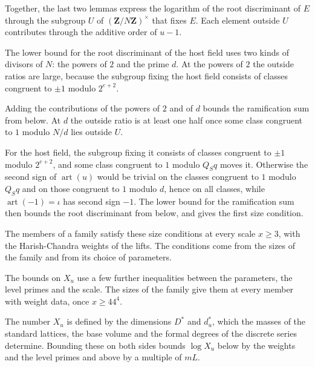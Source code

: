 Together, the last two lemmas express the logarithm of the root discriminant of
$E$ through the subgroup $U$ of $(\mathbf Z/N\mathbf Z)^\times$ that fixes $E$.
Each element outside $U$ contributes through the additive order of $u-1$.

The lower bound for the root discriminant of the host field uses two kinds of
divisors of $N$: the powers of $2$ and the prime $d$. At the powers of $2$ the
outside ratios are large, because the subgroup fixing the host field consists
of classes congruent to $\pm1$ modulo $2^{e+2}$.

Adding the contributions of the powers of $2$ and of $d$ bounds the
ramification sum from below. At $d$ the outside ratio is at least one half once
some class congruent to $1$ modulo $N/d$ lies outside $U$.

For the host field, the subgroup fixing it consists of classes congruent to
$\pm1$ modulo $2^{e+2}$, and some class congruent to $1$ modulo $Q_Sq$ moves it.
Otherwise the second sign of $\operatorname{art}(u)$ would be trivial on the
classes congruent to $1$ modulo $Q_Sq$ and on those congruent to $1$ modulo $d$,
hence on all classes, while $\operatorname{art}(-1)=\iota$ has second sign $-1$.
The lower bound for the ramification sum then bounds the root
discriminant from below, and gives the first size condition.

The members of a family satisfy these size conditions at every scale $x\ge3$,
with the Harish-Chandra weights of the lifts. The conditions come from the
sizes of the family and from its choice of parameters.

The bounds on $X_u$ use a few further inequalities between the parameters, the
level primes and the scale. The sizes of the family give them at every member
with weight data, once $x\ge44^4$.

The number $X_u$ is defined by the dimensions $D^*$ and $d^*_u$, which the
masses of the standard lattices, the base volume and the formal degrees of the
discrete series determine. Bounding these on both sides bounds $\log X_u$ below
by the weights and the level primes and above by a multiple of $mL$.


